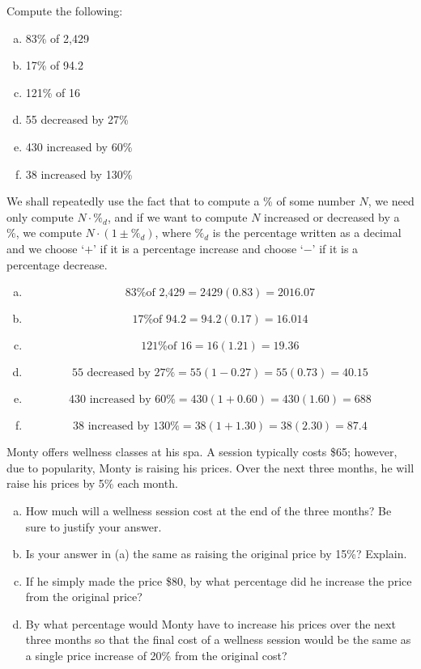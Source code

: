 \documentclass[11pt,letterpaper]{article}
\begin{document}
\newpage



 Compute the following:
	\begin{enumerate}[(a)]
	\item 83\% of 2,429
	\item 17\% of 94.2
	\item 121\% of 16
	\item 55 decreased by 27\%
	\item 430 increased by 60\%
	\item 38 increased by 130\%
	\end{enumerate} \pspace

\sol We shall repeatedly use the fact that to compute a \% of some number $N$, we need only compute $N \cdot \%_d$, and if we want to compute $N$ increased or decreased by a \%, we compute $N \cdot (1 \pm \%_d)$, where $\%_d$ is the percentage written as a decimal and we choose `$+$' if it is a percentage increase and choose `$-$' if it is a percentage decrease. \pspace

\begin{enumerate}[(a)]
\item 
	\[
	\text{83\% of 2,429}= 2429(0.83)= 2016.07
	\] \pspace

\item 
	\[
	\text{17\% of 94.2}= 94.2(0.17)= 16.014
	\] \pspace
 
\item 
	\[
	\text{121\% of 16}= 16(1.21)= 19.36
	\] \pspace
 
\item 
	\[
	\text{55 decreased by 27\%}= 55(1 - 0.27)= 55(0.73)= 40.15
	\] \pspace
 
\item 
	\[
	\text{430 increased by 60\%}= 430(1 + 0.60)= 430(1.60)= 688
	\] \pspace
 
\item 
	\[
	\text{38 increased by 130\%}= 38(1 + 1.30)= 38(2.30)= 87.4
	\] 
\end{enumerate}
	
	

\newpage



 Monty offers wellness classes at his spa. A session typically costs \$65; however, due to popularity, Monty is raising his prices. Over the next three months, he will raise his prices by 5\% each month. 
	\begin{enumerate}[(a)]
	\item How much will a wellness session cost at the end of the three months? Be sure to justify your answer. 
	\item Is your answer in (a) the same as raising the original price by 15\%? Explain. 
	\item If he simply made the price \$80, by what percentage did he increase the price from the original price?
	\item By what percentage would Monty have to increase his prices over the next three months so that the final cost of a wellness session would be the same as a single price increase of 20\% from the original cost?
	\end{enumerate} \pspace
\end{document}
